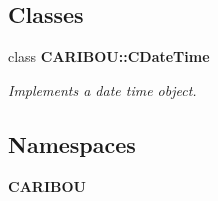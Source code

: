 \subsection*{Classes}
\begin{DoxyCompactItemize}
\item 
class {\bf C\+A\+R\+I\+B\+O\+U\+::\+C\+Date\+Time}
\begin{DoxyCompactList}\small\item\em Implements a date time object. \end{DoxyCompactList}\end{DoxyCompactItemize}
\subsection*{Namespaces}
\begin{DoxyCompactItemize}
\item 
 {\bf C\+A\+R\+I\+B\+OU}
\end{DoxyCompactItemize}
